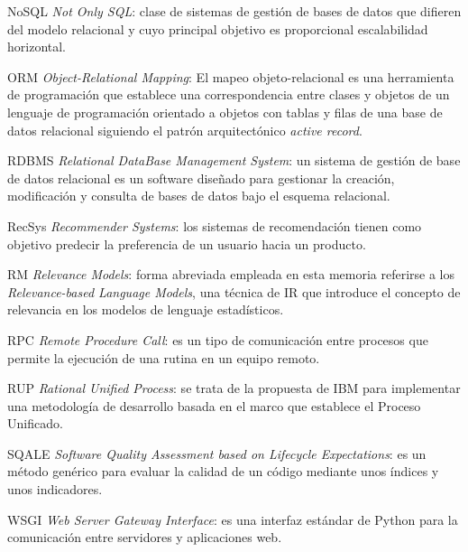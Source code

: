 \begin{description}
\item{NoSQL} \textit{Not Only SQL}: clase de sistemas de gestión de bases de datos que difieren del modelo relacional y cuyo principal objetivo es proporcional escalabilidad horizontal.

\item{ORM} \textit{Object-Relational Mapping}: El mapeo objeto-relacional es una herramienta de programación que establece una correspondencia entre clases y objetos de un lenguaje de programación orientado a objetos con tablas y filas de una base de datos relacional siguiendo el patrón arquitectónico \textit{active record}.

\item{RDBMS} \textit{Relational DataBase Management System}: un sistema de gestión de base de datos relacional es un software diseñado para gestionar la creación, modificación y consulta de bases de datos bajo el esquema relacional.

\item{RecSys} \textit{Recommender Systems}: los sistemas de recomendación tienen como objetivo predecir la preferencia de un usuario hacia un producto.

\item{RM} \textit{Relevance Models}: forma abreviada empleada en esta memoria referirse a los \textit{Relevance-based Language Models}, una técnica de IR que introduce el concepto de relevancia en los modelos de lenguaje estadísticos.

\item{RPC} \textit{Remote Procedure Call}: es un tipo de comunicación entre procesos que permite la ejecución de una rutina en un equipo remoto.

\item{RUP} \textit{Rational Unified Process}: se trata de la propuesta de IBM para implementar una metodología de desarrollo basada en el marco que establece el Proceso Unificado.

\item{SQALE} \textit{Software Quality Assessment based on Lifecycle Expectations}: es un método genérico para evaluar la calidad de un código mediante unos índices y unos indicadores.

\item{WSGI} \textit{Web Server Gateway Interface}: es una interfaz estándar de Python para la comunicación entre servidores y aplicaciones web.
\end{description}